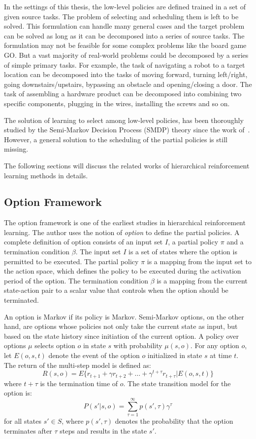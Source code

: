 In the settings of this thesis, the low-level policies are defined trained in a set of given source tasks. The problem of selecting and scheduling them is left to be solved. This formulation can handle many general cases and the target problem can be solved as long as it can be decomposed into a series of source tasks. The formulation may not be feasible for some complex problems like the board game GO. But a vast majority of real-world problems could be decomposed by a series of simple primary tasks. For example, the task of navigating a robot to a target location can be decomposed into the tasks of moving forward, turning left/right, going downstairs/upstairs, bypassing an obstacle and opening/closing a door. The task of assembling a hardware product can be decomposed into combining two specific components, plugging in the wires, installing the screws and so on.

The solution of learning to select among low-level policies, has been thoroughly studied by the Semi-Markov Decision Process (SMDP) theory since the work of~\cite{sutton1999between}. However, a general solution to the scheduling of the partial policies is still missing.

The following sections will discuss the related works of hierarchical reinforcement learning methods in details.

\subsection{Option Framework}
The option framework \cite{sutton1999between} is one of the earliest studies in hierarchical reinforcement learning. The author uses the notion of \textit{option} to define the partial policies. A complete definition of option consists of an input set $I$, a partial policy $\pi$ and a termination condition $\beta$. The input set $I$ is a set of states where the option is permitted to be executed. The partial policy $\pi$ is a mapping from the input set to the action space, which defines the policy to be executed during the activation period of the option. The termination condition $\beta$ is a mapping from the current state-action pair to a scalar value that controls when the option should be terminated.

An option is Markov if its policy is Markov. Semi-Markov options, on the other hand, are options whose policies not only take the current state as input, but based on the state history since initiation of the current option. A policy over options \(\mu \) selects option \(o\) in state \(s\) with probability \(\mu(s,o)\). 
For any option \(o\), let \(E(o,s,t)\) denote the event of the option $o$ initialized in state $s$ at time $t$. The return of the multi-step model is defined as:
\[ R(s,o)=E\{r_{t+1}+\gamma r_{t+2}+\ldots+\gamma^{t+\tau} r_{t+\tau} \lvert E(o,s,t)\} \]
where $t+\tau$ is the termination time of $o$. The state transition model for the option is:
\[P(s' \lvert s,o)=\sum_{\tau=1}^{\infty} p(s',\tau) \gamma^\tau \]
for all states \(s' \in S \), where \( p(s',\tau) \) denotes the probability that the option terminates after \(\tau\) steps and results in the state \(s'\).

